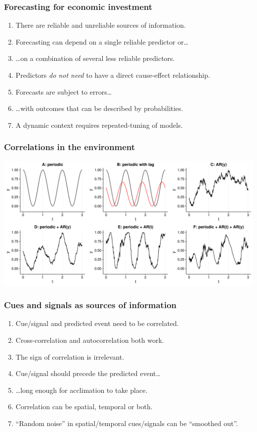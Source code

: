 \documentclass[11pt]{beamer}\usepackage[]{graphicx}\usepackage[]{xcolor}
\begin{document}
\begin{frame}%
\frametitle{Forecasting for economic investment}
\begin{enumerate}
  \item There are reliable and unreliable sources of information.
  \item Forecasting can depend on a single reliable predictor or\ldots
  \item \ldots on a combination of several less reliable predictors.
  \item Predictors \emph{do not need} to have a direct cause-effect relationship.
  \item Forecasts are subject to errors\ldots
  \item \ldots with outcomes that can be described by probabilities.
  \item A dynamic context requires repeated-tuning of models.
\end{enumerate}
\end{frame}

\begin{frame}
  \frametitle{Correlations in the environment}
  \includegraphics[width=\linewidth]{figures/cor_examples2.pdf}
\end{frame}

\begin{frame}%
\frametitle{Cues and signals as sources of information}
\begin{enumerate}
  \item Cue/signal and predicted event need to be correlated.
  \item Cross-correlation and autocorrelation both work.
  \item The sign of correlation is irrelevant.
  \item Cue/signal should precede the predicted event\ldots
  \item \ldots long enough for acclimation to take place.
  \item Correlation can be spatial, temporal or both.
  \item ``Random noise'' in spatial/temporal cues/signals can be ``smoothed out''.
\end{enumerate}
\end{frame}
\end{document}
